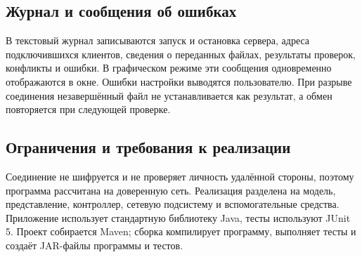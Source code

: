 \subsection{Журнал и сообщения об ошибках}

В текстовый журнал записываются запуск и остановка сервера, адреса подключившихся клиентов, сведения о переданных файлах, результаты проверок, конфликты и ошибки. В графическом режиме эти сообщения одновременно отображаются в окне. Ошибки настройки выводятся пользователю. При разрыве соединения незавершённый файл не устанавливается как результат, а обмен повторяется при следующей проверке.

\subsection{Ограничения и требования к реализации}

Соединение не шифруется и не проверяет личность удалённой стороны, поэтому программа рассчитана на доверенную сеть. Реализация разделена на модель, представление, контроллер, сетевую подсистему и вспомогательные средства. Приложение использует стандартную библиотеку Java, тесты используют JUnit 5. Проект собирается Maven; сборка компилирует программу, выполняет тесты и создаёт JAR-файлы программы и тестов.
